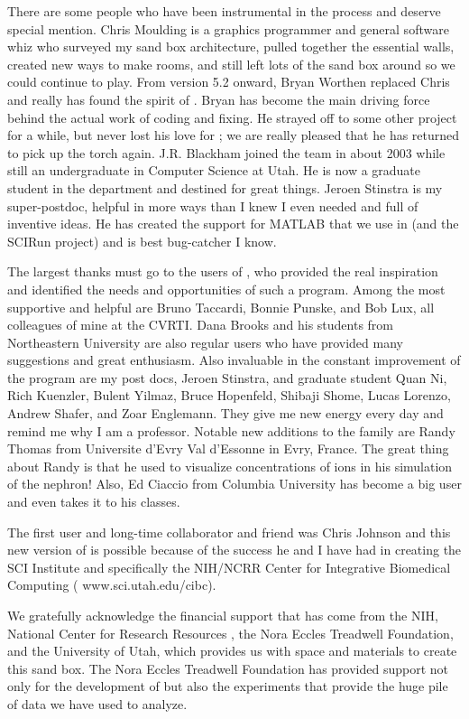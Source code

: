 There are some people who have been instrumental in the process and deserve
special mention.  Chris Moulding is a graphics programmer and general
software whiz who surveyed my sand box architecture, pulled together the
essential walls, created new ways to make rooms, and still left lots of the
sand box around so we could continue to play.  From version 5.2 onward,
Bryan Worthen replaced Chris and really has found the spirit of \map{}.
Bryan has become the main driving force behind the actual work of coding
and fixing.  He strayed off to some other project for a while, but never
lost his love for \map{}; we are really pleased that he has returned to
pick up the torch again. J.R. Blackham joined the team in about 2003 while
still an undergraduate in Computer Science at Utah.  He is now a graduate
student in the department and destined for great things.  Jeroen Stinstra
is my super-postdoc, helpful in more ways than I knew I even needed and
full of inventive ideas.  He has created the support for MATLAB that we use
in \map{} (and the SCIRun project) and is best bug-catcher I know.

The largest thanks must go to the users of \map{}, who provided the real
inspiration and identified the needs and opportunities of such a program.
Among the most supportive and helpful are Bruno Taccardi, Bonnie Punske,
and Bob Lux, all colleagues of mine at the CVRTI. Dana Brooks and his
students from Northeastern University are also regular users who have
provided many suggestions and great enthusiasm.  Also invaluable in the
constant improvement of the program are my post docs, Jeroen Stinstra, and
graduate student Quan Ni, Rich Kuenzler, Bulent Yilmaz, Bruce Hopenfeld,
Shibaji Shome, Lucas Lorenzo, Andrew Shafer, and Zoar Englemann.  They give
me new energy every day and remind me why I am a professor.  Notable new
additions to the family are Randy Thomas from Universite d'Evry Val
d'Essonne in Evry, France.  The great thing about Randy is that he used
\map{} to visualize concentrations of ions in his simulation of the
nephron!  Also, Ed Ciaccio from Columbia University has become a big user
and even takes it to his classes.

The first user and long-time collaborator and friend was Chris Johnson and
this new version of \map{} is possible because of the success he and I have
had in creating the SCI Institute and specifically the NIH/NCRR Center for
Integrative Biomedical Computing (
{www.sci.utah.edu/cibc}).

We gratefully acknowledge the financial support that has come from the NIH,
National Center for Research Resources
, the Nora Eccles
Treadwell Foundation, and the University of Utah, which provides us with
space and materials to create this sand box.  The Nora Eccles Treadwell
Foundation has provided support not only for the development of \map{} but
also the experiments that provide the huge pile of data we have used \map{}
to analyze.

